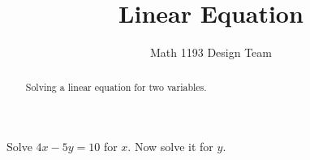 \documentclass[noauthor]{ximera}
\title{Linear Equation}
\author{Math 1193 Design Team}
\begin{document}
\begin{abstract}
    Solving a linear equation for two variables.
\end{abstract}
\maketitle

Solve \(4x - 5y = 10\) for \(x\). Now solve it for \(y\).
\end{document}
